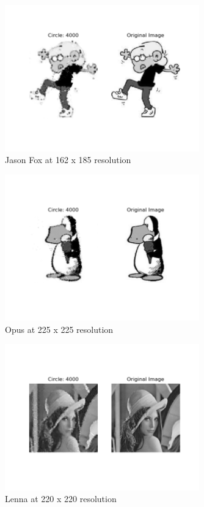 \documentclass[12pt]{article}
\begin{document}
\begin{figure}[H]
\centering
\noindent\includegraphics[width=0.75\textwidth]{../results/jason/jason_4000}
\caption{Jason Fox at 162 x 185 resolution}
\end{figure}

\begin{figure}[H]
\centering
\noindent\includegraphics[width=0.75\textwidth]{../results/opus/opus_4000}
\caption{Opus at 225 x 225 resolution}
\end{figure}

\begin{figure}[H]
\centering
\noindent\includegraphics[width=0.75\textwidth]{../results/lenna/lenna_4000}
\caption{Lenna at 220 x 220 resolution}
\end{figure}
\end{document}
